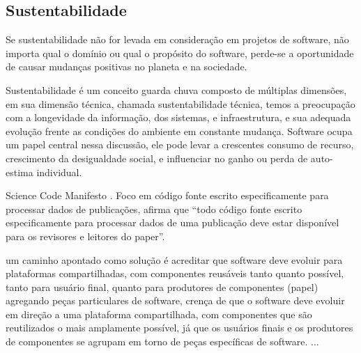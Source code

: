 
\subsection{Sustentabilidade} \label{sustentabilidade}

Se sustentabilidade não for levada em consideração em projetos de software, não
importa qual o domínio ou qual o propósito do software, perde-se a oportunidade
de causar mudanças positivas no planeta e na sociedade.

%

Sustentabilidade é um conceito guarda chuva composto de múltiplas dimensões, em
sua dimensão técnica, chamada sustentabilidade técnica, temos a preocupação com
a longevidade da informação, dos sistemas, e infraestrutura, e sua adequada
evolução frente as condições do ambiente em constante mudança. Software ocupa
um papel central nessa discussão, ele pode levar a crescentes consumo de
recurso, crescimento da desigualdade social, e influenciar no ganho ou perda de
auto-estima individual.


Science Code Manifesto \cite{barnes2013science}.
Foco em código fonte escrito especificamente para processar dados de
publicações, afirma que ``todo código fonte escrito especificamente para
processar dados de uma publicação deve estar disponível para os revisores e
leitores do paper''.

um caminho apontado como solução é acreditar que software deve evoluir para plataformas compartilhadas,
com componentes reusáveis tanto quanto possível, tanto para usuário final, quanto
para produtores de componentes (papel) agregando peças particulares de software,
crença de que o software deve evoluir em direção a uma plataforma
compartilhada, com componentes que são reutilizados o mais amplamente possível,
já que os usuários finais e os produtores de componentes se agrupam em torno de
peças específicas de software.
...

